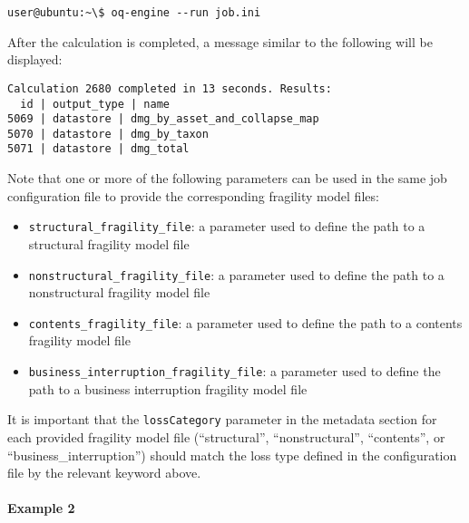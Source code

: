 \begin{Verbatim}[frame=single, commandchars=\\\{\}, samepage=true]
user@ubuntu:~\$ oq-engine --run job.ini
\end{Verbatim}

After the calculation is completed, a message similar to the following will be
displayed:

\begin{Verbatim}[frame=single, commandchars=\\\{\}, samepage=true]
Calculation 2680 completed in 13 seconds. Results:
  id | output_type | name
5069 | datastore | dmg_by_asset_and_collapse_map
5070 | datastore | dmg_by_taxon
5071 | datastore | dmg_total
\end{Verbatim}


Note that one or more of the following parameters can be used in the same job
configuration file to provide the corresponding fragility model files:

\begin{itemize}

  \item \Verb+structural_fragility_file+: a parameter used to define the path
    to a structural \gls{fragility model} file

  \item \Verb+nonstructural_fragility_file+: a parameter used to define the path
    to a nonstructural \gls{fragility model} file

  \item \Verb+contents_fragility_file+: a parameter used to define the path
    to a contents \gls{fragility model} file

  \item \Verb+business_interruption_fragility_file+: a parameter used to define
    the path to a business interruption \gls{fragility model} file

\end{itemize}

It is important that the \Verb+lossCategory+ parameter in the metadata section
for each provided fragility model file (``structural'', ``nonstructural'',
``contents'', or ``business\_interruption'') should match the loss type
defined in the configuration file by the relevant keyword above.


\paragraph{Example 2}

